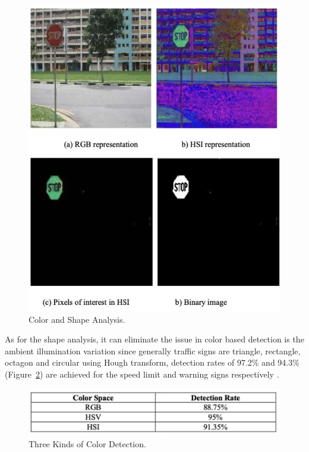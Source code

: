 \documentclass[letterpaper, 10 pt, conference]{ieeeconf}
\begin{document}
\begin{figure}[!t]
    \centering
    \includegraphics[width=0.9\linewidth]{figures/color_shape.jpg} 
    \caption{Color and Shape Analysis.}
    \label{fig:color_shape}
\end{figure}

As for the shape analysis, it can eliminate the issue in color based detection is the ambient illumination variation since generally traffic signs are triangle, rectangle, octagon and circular using Hough transform, detection rates of 97.2\% and 94.3\% (Figure~\ref{fig:three_kind}) are achieved for the speed limit and warning signs respectively \cite{Swathi2017}.

\begin{figure}[!t]
    \centering
    \includegraphics[width=0.9\linewidth]{figures/color_rate.jpg} 
    \caption{Three Kinds of Color Detection.}
    \label{fig:three_kind}
\end{figure}
\end{document}
